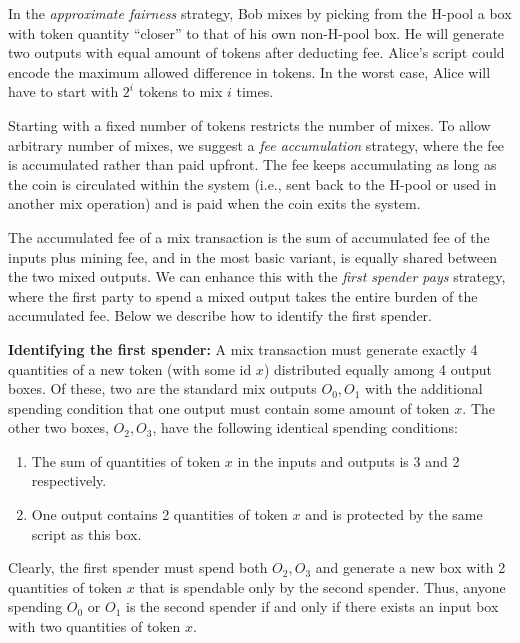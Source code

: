 \documentclass[11pt]{article}
\begin{document}
 In the {\em approximate fairness} strategy, Bob mixes by picking from the H-pool a box with token quantity ``closer'' to that of his own non-H-pool box. He will generate two outputs with equal amount of tokens after deducting fee. Alice's script could encode the maximum allowed difference in tokens. In the worst case, Alice will have to start with $2^i$ tokens to mix $i$ times.
 
 Starting with a fixed number of tokens restricts the number of mixes. To allow arbitrary number of mixes, we suggest a {\em fee accumulation} strategy, where the fee is accumulated rather than paid upfront. %
The fee keeps accumulating as long as the coin is circulated within the system (i.e., sent back to the H-pool or used in another mix operation) and is paid when the coin exits the system.

 The accumulated fee of a mix transaction is the sum of accumulated fee of the inputs plus mining fee, and in the most basic variant, is equally shared between the two mixed outputs.
 We can enhance this with the {\em first spender pays} strategy, where the first party to spend a mixed output takes the entire burden of the accumulated fee. 
 Below we describe how to identify the first spender.
 
 \textbf{Identifying the first spender:} A mix transaction must generate exactly 4 quantities of a new token (with some id $x$) distributed equally among 4 output boxes. Of these, two are the standard mix outputs $O_0, O_1$ with the additional spending condition that one output must contain some amount of token $x$. The other two boxes, $O_2, O_3$, have the following identical spending conditions:
		\begin{enumerate}
			\item The sum of quantities of token $x$ in the inputs and outputs is 3 and 2 respectively.
			\item One output contains 2 quantities of token $x$ and is protected by the same script as this box. 
		\end{enumerate}
	
Clearly, the first spender must spend both $O_2, O_3$ and generate a new box with 2 quantities of token $x$ that is spendable only by the second spender. 
Thus, anyone spending $O_0$ or $O_1$ is the second spender if and only if there exists an input box with two quantities of token $x$. 

\end{document}
